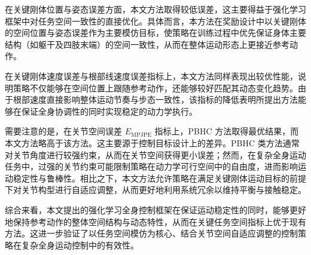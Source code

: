 在关键刚体位置与姿态误差方面，本文方法取得较低误差，这主要得益于强化学习框架中对任务空间一致性的直接优化。具体而言，本方法在奖励设计中以关键刚体的空间位置与姿态误差作为主要模仿目标，使策略在训练过程中优先保证身体主要结构（如躯干及四肢末端）的空间一致性，从而在整体运动形态上更接近参考动作。

在关键刚体速度误差与根部线速度误差指标上，本文方法同样表现出较优性能，说明策略不仅能够在空间位置上跟随参考动作，还能够较好匹配其动态变化趋势。由于根部速度直接影响整体运动节奏与步态一致性，该指标的降低表明所提出方法能够在保证全身协调性的同时实现稳定的动力学执行。

需要注意的是，在关节空间误差 $E_{\mathrm{MPJPE}}$ 指标上，PBHC 方法取得最优结果，而本文方法略高于该方法。这主要源于控制目标设计上的差异。PBHC 类方法通常对关节角度进行较强约束，从而在关节空间获得更小误差；然而，在复杂全身运动任务中，过强的关节约束可能限制策略在动力学可行空间中的自由度，进而影响运动稳定性与鲁棒性。相比之下，本文方法允许策略在满足关键刚体运动目标的前提下对关节构型进行自适应调整，从而更好地利用系统冗余以维持平衡与接触稳定。

综合来看，本文提出的强化学习全身控制框架在保证运动稳定性的同时，能够更好地保持参考动作的整体空间结构与动态特性，从而在关键任务空间指标上优于现有方法。这进一步验证了以任务空间模仿为核心、结合关节空间自适应调整的控制策略在复杂全身运动控制中的有效性。

\begin{table}[t]
	\centering
	\caption{不同方法的性能对比结果（$\downarrow$ 表示越小越好）}
	\label{tab:main_results_cn}
\end{table}


